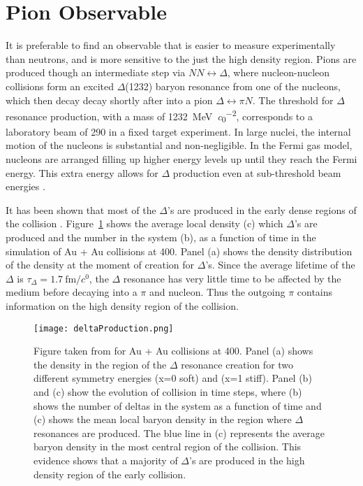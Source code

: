 \section{Pion Observable}
\label{sec:pionObs}
It is preferable to find an observable that is easier to measure experimentally than neutrons, and is more sensitive to the just the high density region. Pions are produced though an intermediate step via $ NN \leftrightarrow \Delta$, where nucleon-nucleon collisions form an excited $\Delta$(1232) baryon resonance from one of the nucleons, which then decay decay shortly after into a pion $\Delta \leftrightarrow \pi N$. The threshold for $\Delta$ resonance production, with a mass of \SI{1232}{\mega\electronvolt\per\clight\squared}, corresponds to a laboratory beam of \SI{290}{\MeVA} in a fixed target experiment. In large nuclei, the internal motion of the nucleons is substantial and non-negligible. In the Fermi gas model, nucleons are arranged filling up higher energy levels up until they reach the Fermi energy. This extra energy allows for $\Delta$ production even at sub-threshold beam energies \cite{fermiEnergy}.


It has been shown that most of the $\Delta$'s are produced in the early dense regions of the collision \cite{mingzhang}. Figure~\ref{fig:deltaProduction} shows the average local density (c) which $\Delta$'s are produced and the number in the system (b), as a function of time in the simulation of Au + Au collisions at \SI{400}{\MeVA}. Panel (a) shows the density distribution of the density at the moment of creation for $\Delta$'s. Since the average lifetime of the $\Delta$  is $\tau_{\Delta} = \SI{1.7}{\femto\metre\per\clight}$, the $\Delta$ resonance has very little time to be affected by the medium before decaying into a $\pi$ and nucleon. Thus the outgoing $\pi$ contains information on the high density region of the collision. 

\begin{figure}[!htb]
\centering
\texttt{[image: deltaProduction.png]}
\caption{Figure taken from \cite{mingzhang} for Au + Au collisions at \SI{400}{\MeVA}. Panel (a) shows the density in the region of the $\Delta$ resonance creation for two different symmetry energies (x=0 soft) and (x=1 stiff). Panel (b) and (c) show the evolution of collision in time steps, where (b) shows the number of deltas in the system as a function of time and (c) shows the mean local baryon density in the region where $\Delta$ resonances are produced. The blue line in (c) represents the average baryon density in the most central region of the collision. This evidence shows that a majority of $\Delta$'s are produced in the high density region of the early collision.}
\label{fig:deltaProduction}
\end{figure}

